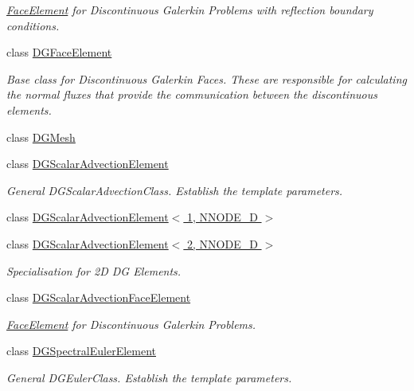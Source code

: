 \begin{DoxyCompactItemize}
\begin{DoxyCompactList}\small\item\em \hyperlink{classoomph_1_1FaceElement}{Face\+Element} for Discontinuous Galerkin Problems with reflection boundary conditions. \end{DoxyCompactList}\item 
class \hyperlink{classoomph_1_1DGFaceElement}{D\+G\+Face\+Element}
\begin{DoxyCompactList}\small\item\em Base class for Discontinuous Galerkin Faces. These are responsible for calculating the normal fluxes that provide the communication between the discontinuous elements. \end{DoxyCompactList}\item 
class \hyperlink{classoomph_1_1DGMesh}{D\+G\+Mesh}
\item 
class \hyperlink{classoomph_1_1DGScalarAdvectionElement}{D\+G\+Scalar\+Advection\+Element}
\begin{DoxyCompactList}\small\item\em General D\+G\+Scalar\+Advection\+Class. Establish the template parameters. \end{DoxyCompactList}\item 
class \hyperlink{classoomph_1_1DGScalarAdvectionElement_3_011_00_01NNODE__1D_01_4}{D\+G\+Scalar\+Advection\+Element$<$ 1, N\+N\+O\+D\+E\+\_\+D $>$}
\item 
class \hyperlink{classoomph_1_1DGScalarAdvectionElement_3_012_00_01NNODE__1D_01_4}{D\+G\+Scalar\+Advection\+Element$<$ 2, N\+N\+O\+D\+E\+\_\+D $>$}
\begin{DoxyCompactList}\small\item\em Specialisation for 2D DG Elements. \end{DoxyCompactList}\item 
class \hyperlink{classoomph_1_1DGScalarAdvectionFaceElement}{D\+G\+Scalar\+Advection\+Face\+Element}
\begin{DoxyCompactList}\small\item\em \hyperlink{classoomph_1_1FaceElement}{Face\+Element} for Discontinuous Galerkin Problems. \end{DoxyCompactList}\item 
class \hyperlink{classoomph_1_1DGSpectralEulerElement}{D\+G\+Spectral\+Euler\+Element}
\begin{DoxyCompactList}\small\item\em General D\+G\+Euler\+Class. Establish the template parameters. \end{DoxyCompactList}\item 

\end{DoxyCompactItemize}
